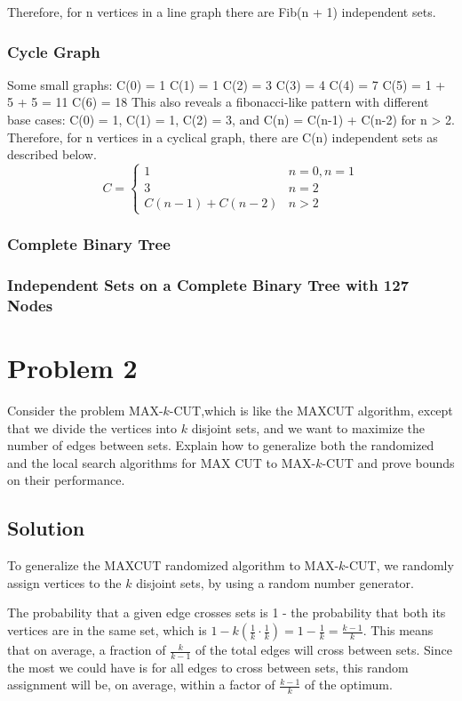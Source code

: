 \documentclass[11pt]{article}
\begin{document}
Therefore, for n vertices in a line graph there are Fib(n + 1) independent sets.

\subsubsection{Cycle Graph}
Some small graphs: 
C(0) = 1
C(1) = 1 
C(2) = 3
C(3) = 4
C(4) = 7
C(5) = 1 + 5 + 5 = 11
C(6) = 18
This also reveals a fibonacci-like pattern with different base cases: C(0) = 1, C(1) = 1, C(2) = 3, and C(n) = C(n-1) + C(n-2) for n > 2. Therefore, for n vertices in a cyclical graph, there are C(n) independent sets as described below.
$$ C  = 
\begin{cases}
	1 & n = 0, n = 1\\
	3 & n = 2\\
	C(n - 1) + C(n - 2) & n > 2 
\end{cases} 
$$
\subsubsection{Complete Binary Tree}

\subsubsection{Independent Sets on a Complete Binary Tree with 127 Nodes}

\section{Problem 2}
Consider the problem MAX-$k$-CUT,which is like the MAXCUT algorithm, except that we divide the vertices into $k$ disjoint sets, and we want to maximize the number of edges between sets. Explain how to generalize both the randomized and the local search algorithms for MAX CUT to MAX-$k$-CUT and prove bounds on their performance.
\subsection{Solution}
To generalize the MAXCUT randomized algorithm to MAX-$k$-CUT, we randomly assign vertices to the $k$ disjoint sets, by using a random number generator. 

The probability that a given edge crosses sets is 1 - the probability that both its vertices are in the same set, which is $1- k(\frac{1}{k}\cdot\frac{1}{k})= 1 - \frac{1}{k} = \frac{k-1}{k}$. This means that on average, a fraction of $\frac{k}{k-1}$ of the total edges will cross between sets. Since the most we could have is for all edges to cross between sets, this random assignment will be, on average, within a factor of $\frac{k-1}{k}$ of the optimum.
\end{document}
